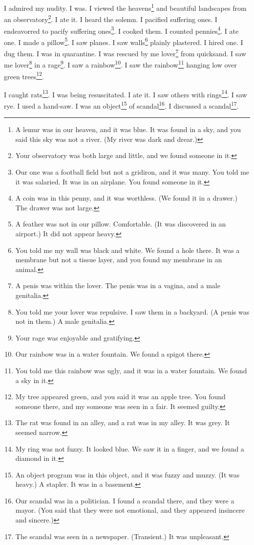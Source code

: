 \documentclass[12pt]{book}
\begin{document}
 I admired my nudity. I was. I viewed the heavens\footnote{A lemur was in our heaven, and it was blue. It was found in a sky, and you said this sky was not a river. (My river was dark and drear.)} and beautiful landscapes from an observatory\footnote{Your observatory was both large and little, and we found someone in it.}. I ate it. I heard the solemn. I pacified suffering ones. I endeavorred to pacify suffering ones\footnote{Our one was a football field but not a gridiron, and it was many. You told me it was salaried. It was in an airplane. You found someone in it.}. I cooked them. I counted pennies\footnote{A coin was in this penny, and it was worthless. (We found it in a drawer.) The drawer was not large.}. I ate one. I made a pillow\footnote{A feather was not in our pillow. Comfortable. (It was discovered in an airport.) It did not appear heavy.}. I saw planes. I saw walls\footnote{You told me my wall was black and white. We found a hole there. It was a membrane but not a tissue layer, and you found my membrane in an animal.} plainly plastered. I hired one. I dug them. I was in quarantine. I was rescued by me lover\footnote{A penis was within the lover. The penis was in a vagina, and a male genitalia.} from quicksand. I saw me lover\footnote{You told me your lover was repulsive. I saw them in a backyard. (A penis was not in them.) A male genitalia.} in a rage\footnote{Your rage was enjoyable and gratifying.}. I saw a rainbow\footnote{Our rainbow was in a water fountain. We found a spigot there.}. I saw the rainbow\footnote{You told me this rainbow was ugly, and it was in a water fountain. We found a sky in it.} hanging low over green trees\footnote{My tree appeared green, and you said it was an apple tree. You found someone there, and my someone was seen in a fair. It seemed guilty.}. 

 I caught rats\footnote{The rat was found in an alley, and a rat was in my alley. It was grey. It seemed narrow.}. I was being resuscitated. I ate it. I saw others with rings\footnote{My ring was not fuzzy. It looked blue. We saw it in a finger, and we found a diamond in it.}. I saw rye. I used a hand-saw. I was an object\footnote{An object program was in this object, and it was fuzzy and muzzy. (It was heavy.) A stapler. It was in a basement.} of scandal\footnote{Our scandal was in a politician. I found a scandal there, and they were a mayor. (You said that they were not emotional, and they appeared insincere and sincere.)}. I discussed a scandal\footnote{The scandal was seen in a newspaper. (Transient.) It was unpleasant.}. 
\end{document}
